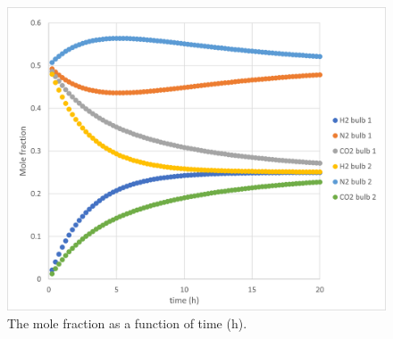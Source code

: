 \documentclass[11]{report}
\begin{document}
\begin{figure}
\includegraphics[width=\linewidth]{graph_of_results.png}
\caption{The mole fraction as a function of time (h).}
\label{fig:fig_1}
\end{figure}
\end{document}

